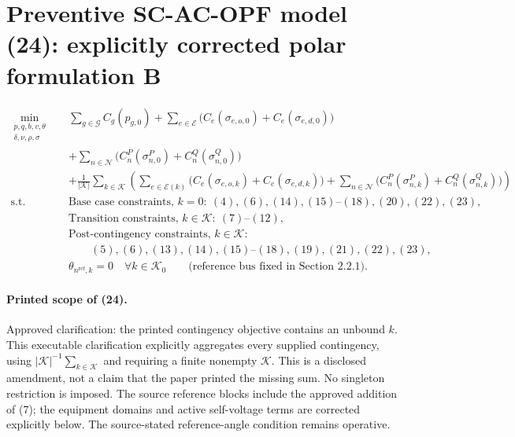 \documentclass{article}
\begin{document}
\section*{Preventive SC-AC-OPF model (24): explicitly corrected polar formulation B}

\begin{equation}
\begin{aligned}
\min_{\substack{p,q,b,v,\theta\\\delta,\nu,\rho,\sigma}}\quad
&\sum_{g\in\mathcal G}C_g(p_{g,0})
 +\sum_{e\in\mathcal E}\bigl(C_e(\sigma_{e,o,0})+C_e(\sigma_{e,d,0})\bigr)\\
&+\sum_{n\in\mathcal N}\bigl(C_n^P(\sigma_{n,0}^P)+C_n^Q(\sigma_{n,0}^Q)\bigr)\\
&+\frac{1}{|\mathcal K|}\sum_{k\in\mathcal K}\left(
 \sum_{e\in\mathcal E(k)}\bigl(C_e(\sigma_{e,o,k})+C_e(\sigma_{e,d,k})\bigr)
 +\sum_{n\in\mathcal N}\bigl(C_n^P(\sigma_{n,k}^P)+C_n^Q(\sigma_{n,k}^Q)\bigr)
 \right)\\
\text{s.t.}\quad
&\text{Base case constraints, }k=0:\ (4),(6),(14),(15)\text{--}(18),(20),(22),(23),\\
&\text{Transition constraints, }k\in\mathcal K:\ (7)\text{--}(12),\\
&\text{Post-contingency constraints, }k\in\mathcal K:\\
&\hspace{2em}(5),(6),(13),(14),(15)\text{--}(18),(19),(21),(22),(23),\\
&\theta_{n^{\mathrm{ref}},k}=0\quad\forall k\in\mathcal K_0
\qquad\text{(reference bus fixed in Section 2.2.1).}
\end{aligned}\tag{24}
\end{equation}

\paragraph{Printed scope of (24).}
Approved clarification: the printed contingency objective contains an unbound $k$. This executable clarification explicitly aggregates every supplied contingency, using $|\mathcal K|^{-1}\sum_{k\in\mathcal K}$ and requiring a finite nonempty $\mathcal K$. This is a disclosed amendment, not a claim that the paper printed the missing sum. No singleton restriction is imposed. The source reference blocks include the approved addition of (7); the equipment domains and active self-voltage terms are corrected explicitly below. The source-stated reference-angle condition remains operative.
\end{document}

